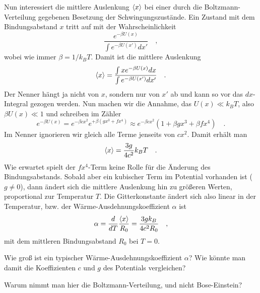 Nun interessiert die mittlere Auslenkung $\braket{x}$ bei einer durch die Boltzmann-Verteilung gegebenen Besetzung der Schwingungszustände. Ein Zustand mit dem Bindungsabstand $x$ tritt auf mit der Wahrscheinlichkeit
\begin{equation}
    \frac{e^{- \beta U(x)}}{\int  e^{- \beta U(x')} dx'} \quad ,
\end{equation}
wobei wie immer $\beta = 1 / k_B T$.
Damit ist die mittlere Auslenkung
\begin{equation}
  \braket{x} =   \frac{\int x e^{- \beta U(x)} dx}{\int e^{- \beta U(x')} dx'} \quad .
\end{equation}
Der Nenner hängt ja nicht von $x$, sondern nur von $x'$ ab und kann so vor das $dx$-Integral gezogen werden. Nun machen wir die Annahme, das $U(x) \ll k_B T$, also $\beta U(x) \ll 1$ und schreiben im Zähler
\begin{equation}
    e^{- \beta U(x)} = e^{- \beta c x^2} e^{+ \beta (g x^3 + f x^4)} \approx e^{- \beta c x^2}  \left( 1+ \beta g x^3 + \beta f x^4 \right)
    \quad .
\end{equation}
Im Nenner ignorieren wir gleich alle Terme jenseits von $c x^2$. Damit erhält man 
\begin{equation}
    \braket{x} = \frac{3 g}{4 c^2} k_B T \quad .
\end{equation}
Wie erwartet spielt der $f x^4$-Term keine Rolle für die Änderung des Bindungsabstands.
Sobald aber ein kubischer Term im Potential vorhanden ist ($g \neq 0$), dann ändert sich die mittlere Auslenkung hin zu größeren Werten, proportional zur Temperatur $T$. Die Gitterkonstante ändert sich also linear in der Temperatur, bzw. der Wärme-Ausdehnungskoeffizient $\alpha$ ist 
\begin{equation}
    \alpha = \frac{d}{dT} \frac{ \braket{x}}{R_0} = \frac{3 g k_B}{4 c^2 R_0}  \quad ,
\end{equation}
mit dem mittleren Bindungsabstand $R_0$ bei $T=0$.

\begin{questions} 
\item Wie groß ist ein typischer Wärme-Ausdehnungskoeffizient $\alpha$? Wie könnte man damit die Koeffizienten $c$ und $g$ des Potentials vergleichen?
\item Warum nimmt man hier die Boltzmann-Verteilung, und nicht Bose-Einstein?
\end{questions}
 



